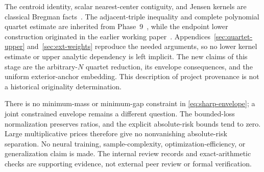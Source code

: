 \documentclass[11pt]{article}
\theoremstyle{remark}\newtheorem{remark}[theorem]{Remark}
\begin{document}
The centroid identity, scalar nearest-center contiguity, and Jensen
kernels are classical Bregman facts~\cite{banerjee}. The adjacent-triple
inequality and complete polynomial quartet estimate are inherited from
Phase~9~\cite{huang9}, while the endpoint lower construction originated in
the earlier working paper~\cite{huang8}. Appendices~\ref{sec:quartet-upper}
and~\ref{sec:ext-weights} reproduce the needed arguments, so no lower
kernel estimate or upper analytic dependency is left implicit. The new
claims of this stage are the arbitrary-$N$ quartet reduction, its envelope
consequences, and the uniform exterior-anchor embedding. This description
of project provenance is not a historical originality determination.

There is no minimum-mass or minimum-gap constraint in
\eqref{eq:sharp-envelope}; a joint constrained envelope remains a different
question. The bounded-loss normalization preserves ratios, and the
explicit absolute-risk bounds tend to zero. Large multiplicative prices
therefore give no nonvanishing absolute-risk separation. No neural
training, sample-complexity, optimization-efficiency, or generalization
claim is made. The internal review records and exact-arithmetic checks
are supporting evidence, not external peer review or formal verification.

\appendix



\end{document}
